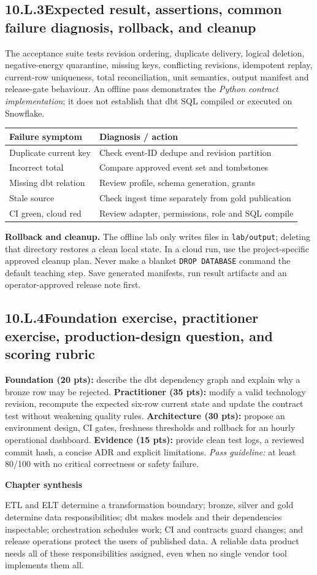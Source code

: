 \documentclass[11pt,twoside]{article}
\newcommand{\topic}[2]{\subsection*{#1\quad #2}}
\begin{document}
\newpage
\topic{10.L.3}{Expected result, assertions, common failure diagnosis, rollback, and cleanup}
The acceptance suite tests revision ordering, duplicate delivery, logical deletion, negative-energy quarantine, missing keys, conflicting revisions, idempotent replay, current-row uniqueness, total reconciliation, unit semantics, output manifest and release-gate behaviour. An offline pass demonstrates the \emph{Python contract implementation}; it does not establish that dbt SQL compiled or executed on Snowflake.
\begin{center}\renewcommand{\arraystretch}{1.10}\begin{tabularx}{\linewidth}{@{}p{33mm}X@{}}\toprule
\textbf{Failure symptom}&\textbf{Diagnosis / action}\\\midrule
Duplicate current key&Check event-ID dedupe and revision partition\\
Incorrect total&Compare approved event set and tombstones\\
Missing dbt relation&Review profile, schema generation, grants\\
Stale source&Check ingest time separately from gold publication\\
CI green, cloud red&Review adapter, permissions, role and SQL compile\\\bottomrule\end{tabularx}\end{center}
\textbf{Rollback and cleanup.} The offline lab only writes files in \texttt{lab/output}; deleting that directory restores a clean local state. In a cloud run, use the project-specific approved cleanup plan. Never make a blanket \texttt{DROP DATABASE} command the default teaching step. Save generated manifests, run result artifacts and an operator-approved release note first.
\topic{10.L.4}{Foundation exercise, practitioner exercise, production-design question, and scoring rubric}
\textbf{Foundation (20 pts):} describe the dbt dependency graph and explain why a bronze row may be rejected. \textbf{Practitioner (35 pts):} modify a valid technology revision, recompute the expected six-row current state and update the contract test without weakening quality rules. \textbf{Architecture (30 pts):} propose an environment design, CI gates, freshness thresholds and rollback for an hourly operational dashboard. \textbf{Evidence (15 pts):} provide clean test logs, a reviewed commit hash, a concise ADR and explicit limitations. \emph{Pass guideline:} at least 80/100 with no critical correctness or safety failure.
\begin{insight}\textbf{Chapter synthesis}\par
ETL and ELT determine a transformation boundary; bronze, silver and gold determine data responsibilities; dbt makes models and their dependencies inspectable; orchestration schedules work; CI and contracts guard changes; and release operations protect the users of published data. A reliable data product needs all of these responsibilities assigned, even when no single vendor tool implements them all.\end{insight}
\end{document}
